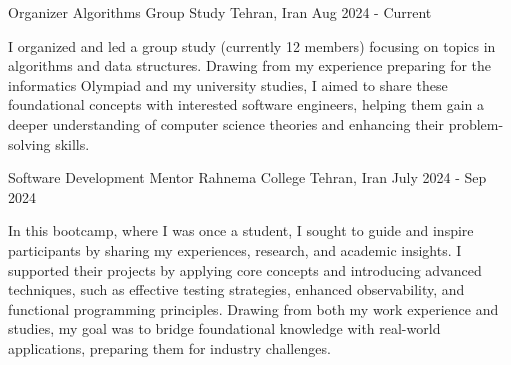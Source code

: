 

\begin{cventries}
  \cventry
  {Organizer} %
  {Algorithms Group Study} %
  {Tehran, Iran} %
  {Aug 2024 - Current} %
  {
    \begin{cvitems}
    \item {I organized and led a group study (currently 12 members) focusing on topics in algorithms and data structures. Drawing from my experience preparing for the informatics Olympiad and my university studies, I aimed to share these foundational concepts with interested software engineers, helping them gain a deeper understanding of computer science theories and enhancing their problem-solving skills.}
    \end{cvitems}
  }

  \cventry
  {Software Development Mentor} %
  {Rahnema College} %
  {Tehran, Iran} %
  {July 2024 - Sep 2024} %
  {
    \begin{cvitems}
    \item {In this bootcamp, where I was once a student, I sought to guide and inspire participants by sharing my experiences, research, and academic insights. I supported their projects by applying core concepts and introducing advanced techniques, such as effective testing strategies, enhanced observability, and functional programming principles. Drawing from both my work experience and studies, my goal was to bridge foundational knowledge with real-world applications, preparing them for industry challenges.}
    \end{cvitems}
  }
\end{cventries}
